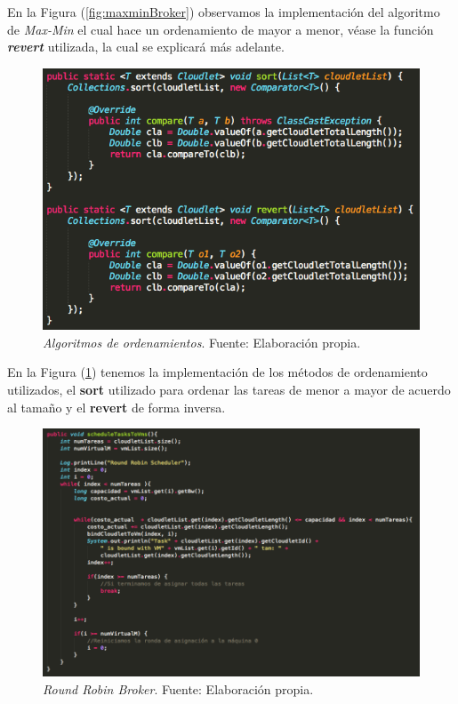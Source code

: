 En la Figura (\ref{fig:maxminBroker}) observamos la implementaci\'on del algoritmo de \textit{Max-Min} el cual hace un ordenamiento de mayor a menor, v\'ease la funci\'on \textbf{\textit{revert}} utilizada, la cual se explicar\'a m\'as adelante.

\newpage


\setcounter{figure}{15}
\renewcommand\thefigure{\arabic{figure}}
\begin{figure}[h!]
	\centering
	\includegraphics[scale=0.5]{media/ordenamientos}
	\caption{\textit{Algoritmos de ordenamientos}. Fuente: Elaboración propia.}
	\label{fig:sortRevert}
\end{figure}

En la Figura (\ref{fig:sortRevert}) tenemos la implementaci\'on de los m\'etodos de ordenamiento utilizados, el \textbf{sort} utilizado para ordenar las tareas de menor a mayor de acuerdo al tamaño y el \textbf{revert} de forma inversa.

\newpage
\setcounter{figure}{16}
\renewcommand\thefigure{\arabic{figure}}
\begin{figure}[h!]
	\centering
	\includegraphics[scale=0.4]{media/RRBroker}
	\caption{\textit{Round Robin Broker}. Fuente: Elaboración propia.}
	\label{fig:RRBroker}
\end{figure}

